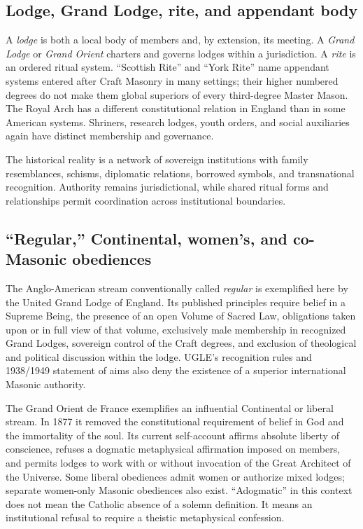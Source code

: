 \subsection{Lodge, Grand Lodge, rite, and appendant body}

A \emph{lodge} is both a local body of members and, by extension, its meeting. A \emph{Grand Lodge} or \emph{Grand Orient} charters and governs lodges within a jurisdiction. A \emph{rite} is an ordered ritual system. “Scottish Rite” and “York Rite” name appendant systems entered after Craft Masonry in many settings; their higher numbered degrees do not make them global superiors of every third-degree Master Mason. The Royal Arch has a different constitutional relation in England than in some American systems. Shriners, research lodges, youth orders, and social auxiliaries again have distinct membership and governance.

The historical reality is a network of sovereign institutions with family resemblances, schisms, diplomatic relations, borrowed symbols, and transnational recognition. Authority remains jurisdictional, while shared ritual forms and relationships permit coordination across institutional boundaries.

\subsection{“Regular,” Continental, women’s, and co-Masonic obediences}

The Anglo-American stream conventionally called \emph{regular} is exemplified here by the United Grand Lodge of England. Its published principles require belief in a Supreme Being, the presence of an open Volume of Sacred Law, obligations taken upon or in full view of that volume, exclusively male membership in recognized Grand Lodges, sovereign control of the Craft degrees, and exclusion of theological and political discussion within the lodge. UGLE's recognition rules and 1938/1949 statement of aims also deny the existence of a superior international Masonic authority.

The Grand Orient de France exemplifies an influential Continental or liberal stream. In 1877 it removed the constitutional requirement of belief in God and the immortality of the soul. Its current self-account affirms absolute liberty of conscience, refuses a dogmatic metaphysical affirmation imposed on members, and permits lodges to work with or without invocation of the Great Architect of the Universe. Some liberal obediences admit women or authorize mixed lodges; separate women-only Masonic obediences also exist. “Adogmatic” in this context does not mean the Catholic absence of a solemn definition. It means an institutional refusal to require a theistic metaphysical confession.

